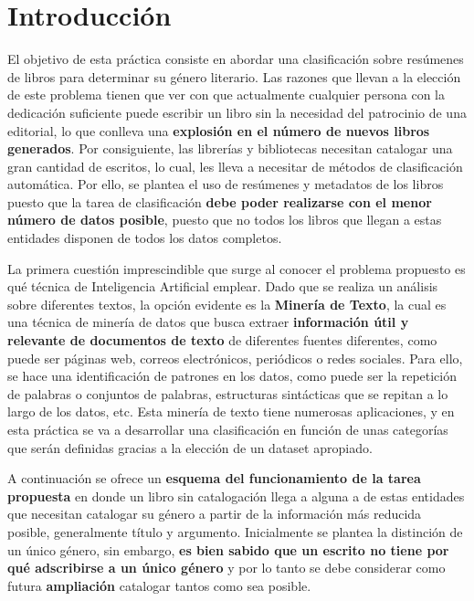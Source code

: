 \documentclass[12pt,a4paper, xcolor=table]{article}
\begin{document}
\section{Introducción}

El objetivo de esta práctica consiste en abordar una clasificación sobre resúmenes de libros para determinar su género literario. Las razones que llevan a la elección de este problema tienen que ver con que actualmente cualquier persona con la dedicación suficiente puede escribir un libro sin la necesidad del patrocinio de una editorial, lo que conlleva una \textbf{explosión en el número de nuevos libros generados}. Por consiguiente, las librerías y bibliotecas necesitan catalogar una gran cantidad de escritos, lo cual, les lleva a necesitar de métodos de clasificación automática. Por ello, se plantea el uso de resúmenes y metadatos de los libros puesto que la tarea de clasificación \textbf{debe poder realizarse con el menor número de datos posible}, puesto que no todos los libros que llegan a estas entidades disponen de todos los datos completos.

\vspace{3mm}

La primera cuestión imprescindible que surge al conocer el problema propuesto es qué técnica de Inteligencia Artificial emplear. Dado que se realiza un análisis sobre diferentes textos, la opción evidente es la \textbf{Minería de Texto}, la cual es una técnica de minería de datos que busca extraer \textbf{información útil y relevante de documentos de texto} de diferentes fuentes diferentes, como puede ser páginas web,
correos electrónicos, periódicos o redes sociales. Para ello, se hace una identificación de patrones en los datos, como puede ser la repetición de palabras o conjuntos de palabras, estructuras sintácticas que se repitan a lo largo de los datos, etc. Esta minería de texto tiene numerosas aplicaciones, y en esta práctica se va a desarrollar una clasificación en función de unas categorías que serán definidas gracias a la elección de un dataset apropiado.

\vspace{3mm}

A continuación se ofrece un \textbf{esquema del funcionamiento de la tarea propuesta} en donde un libro sin catalogación llega a alguna a de estas entidades que necesitan catalogar su género a partir de la información más reducida posible, generalmente título y argumento. Inicialmente se plantea la distinción de un único género, sin embargo, \textbf{es bien sabido que un escrito no tiene por qué adscribirse a un único género} y por lo tanto se debe considerar como futura \textbf{ampliación} catalogar tantos como sea posible.
\end{document}
